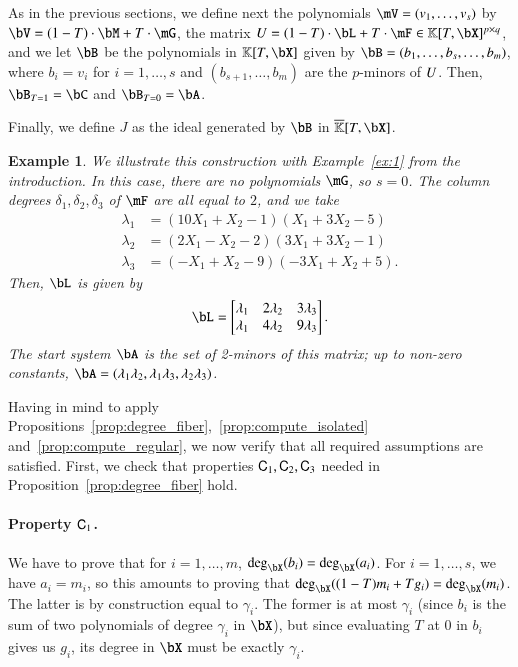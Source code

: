 \documentclass[amsthm]{elsart}
\newtheorem{example}[definition]{Example}
\begin{document}
As in the previous sections, we define next the polynomials
$\mV=(v_1,\dots,v_s)$ by $\bV = (1-T) \cdot \bM + T \cdot \mG$, the
matrix $\mU=(1-T)\cdot \bL + T \cdot \mF \in \KK[T,\bX]^{p\times q}$,
and we let $\bB$ be the polynomials in $\KK[T,\bX]$ given by
$\bB=(b_1,\dots,b_s,\dots,b_m)$, where $b_i=v_i$ for $i=1,\dots,s$ and
$(b_{s+1},\dots,b_{m})$ are the $p$-minors of ${U}$.  Then, $\bB_{T=1}=\bC$ and $\bB_{T=0}=\bA$.

Finally, we define $J$ as the ideal generated by $\bB$ in
$\KKbar[T,\bX]$.
\begin{example}\label{ex:coldeg}
  We illustrate this construction with Example~\ref{ex:1} from the
  introduction. In this case, there are no polynomials $\mG$, so
  $s=0$. The column degrees $\delta_1,\delta_2,\delta_3$ of $\mF$
  are all equal to $2$, and we take
  \begin{align*}
    \lambda_1 &= (10X_1+X_2-1)(X_1+3X_2-5)\\
    \lambda_2 &= (2X_1-X_2-2)(3X_1+3X_2-1)\\
    \lambda_3 &= (-X_1+X_2-9)(-3X_1+X_2+5).
  \end{align*}
Then, $\bL$ is given by
\[\bL=\begin{bmatrix} 
\lambda_1 & 2 \lambda_2 & 3\lambda_3 \\
\lambda_1 & 4 \lambda_2 & 9\lambda_3 
\end{bmatrix}.\]
The start system $\bA$ is the set of 2-minors of this matrix;
up to non-zero constants, $\bA=(\lambda_1\lambda_2, \lambda_1\lambda_3, \lambda_2\lambda_3)$.
\end{example}




Having in mind to apply
Propositions~\ref{prop:degree_fiber},~\ref{prop:compute_isolated}
and~\ref{prop:compute_regular}, we now verify that all required
assumptions are satisfied. First, we check that properties
$\mathsf{C}_1,\mathsf{C}_2,\mathsf{C}_3$ needed in
Proposition~\ref{prop:degree_fiber} hold.

\paragraph*{Property $\mathsf{C}_1$.} We have to prove that for $i=1,\dots,m$,
$\deg_\bX(b_i)=\deg_\bX(a_i)$. 
For $i=1,\dots,s$, we have $a_i=m_i$, so
this amounts to proving that $\deg_\bX((1-T) m_i +
T g_i)=\deg_\bX(m_i)$. The latter is by construction equal to
$\gamma_i$. The former is at most $\gamma_i$ (since $b_i$ is the sum
of two polynomials of degree $\gamma_i$ in $\bX$), but since
evaluating $T$ at $0$ in $b_i$ gives us $g_i$, its degree in $\bX$
must be exactly $\gamma_i$.
\end{document}
